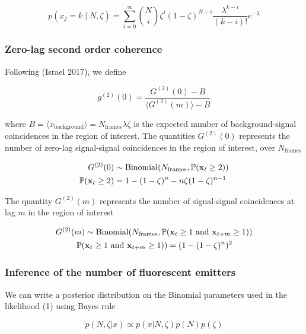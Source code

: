\documentclass[a4paper, twocolumn, superscriptaddress,prl]{revtex4}  %
\begin{document}
\begin{equation}
p(x_{j}=k \mid N, \zeta) = \sum_{i=0}^{\infty} \binom{N}{i} \zeta^i (1-\zeta)^{N-i} \frac{\lambda^{k-i}}{(k-i)!} e^{-\lambda}
\end{equation}

\subsubsection{Zero-lag second order coherence}


Following (Israel 2017), we define

\begin{equation}
g^{(2)}(0) = \frac{G^{(2)}(0)-B}{\langle G^{(2)}(m)\rangle -B}
\end{equation}

where $B = \langle x_{\mathrm{background}}\rangle = N_{\mathrm{frames}}\lambda\zeta$ is the expected number of background-signal coincidences in the region of interest. The quantities $G^{(2)}(0)$ represents the number of zero-lag signal-signal coincidences in the region of interest, over $N_{\mathrm{frames}}$

\begin{align*}
G^{(2)}(0) &\sim \mathrm{Binomial}(N_{\mathrm{frames}}, \mathbb{P}(\bold{x}_{t} \geq 2))\\
\mathbb{P}(\bold{x}_{t} \geq 2) &= 1 - (1-\zeta)^n - n\zeta (1-\zeta)^{n-1}
\end{align*}

The quantity $G^{(2)}(m)$ represents the number of signal-signal coincidences at lag $m$ in the region of interest

\begin{align*}
G^{(2)}(m) &\sim \mathrm{Binomial}(N_{\mathrm{frames}}, \mathbb{P}(\bold{x}_{t} \geq 1 \text{ and } \bold{x}_{t+m} \geq 1))\\
\mathbb{P}(&\bold{x}_{t} \geq 1 \text{ and } \bold{x}_{t+m} \geq 1)) = (1 - (1-\zeta)^n)^2
\end{align*}

\subsubsection{Inference of the number of fluorescent emitters}

We can write a posterior distribution on the Binomial parameters used in the likelihood (1) using Bayes rule

\begin{equation*}
p(N,\zeta|x) \propto p(x|N,\zeta)p(N)p(\zeta)
\end{equation*}
\end{document}

